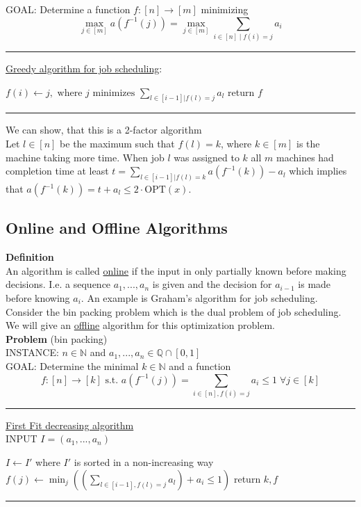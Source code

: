 \documentclass[a4paper, 12pt]{article}
\begin{document}
	\noindent GOAL: Determine a function $f: [n] \to [m]$ minimizing \[\max_{j \in [m]} a(f^{-1}(j)) = \max_{j \in [m]} \sum_{i \in [n] \; | \; f(i) = j} a_i\]
	
	\par\noindent\rule{\textwidth}{0.4pt}
	\noindent\underline{Greedy algorithm for job scheduling}:
	\begin{algorithmic}[1]
			\State $f(i) \gets j, \text{ where $j$ minimizes } \sum_{l \in [i-1] | f(l) = j} a_l$
		\EndFor
		\State return $f$
	\end{algorithmic}
	\par\noindent\rule{\textwidth}{0.4pt}
	We can show, that this is a 2-factor algorithm\\
	Let $l \in [n]$ be the maximum such that $f(l) = k$, where $k \in [m]$ is the machine taking more time. When job $l$ was assigned to $k$ all $m$ machines had completion time at least $t = \sum_{l \in [i-1] | f(l) = k} a(f^{-1}(k))-a_l$ which implies that $a(f^{-1}(k)) = t+a_l \leq 2\cdot\text{OPT}(x)$.
	
	\subsection{Online and Offline Algorithms}
	\textbf{Definition}\\
	An algorithm is called \underline{online} if the input in only partially known before making decisions. I.e. a sequence $a_1,...,a_n$ is given and the decision for $a_{i-1}$ is made before knowing $a_i$. An example is Graham's algorithm for job scheduling.\\
	
	Consider the bin packing problem which is the dual problem of job scheduling. We will give an \underline{offline} algorithm for this optimization problem.\\
	\textbf{Problem} (bin packing)\\
	INSTANCE: $n \in \mathbb{N}$ and $a_1,...,a_n \in \mathbb{Q} \cap [0,1]$\\
	GOAL: Determine the minimal $k \in \mathbb{N}$ and a function \[f: [n] \to [k] \text{ s.t. } a(f^{-1}(j)) = \sum_{i \in [n], f(i) = j} a_i \leq 1 \; \forall j \in [k]\]
	\par\noindent\rule{\textwidth}{0.4pt}
	\underline{First Fit decreasing algorithm}\\
	INPUT $I = (a_1,...,a_n)$
	\begin{algorithmic}[1]
		\State $I \gets I'$ where $I'$ is sorted in a non-increasing way
			\State $f(j) \gets \min_j ((\sum_{l \in [i-1], f(l) = j} a_l) + a_i \leq 1)$
		\EndFor
		\State return $k,f$
	\end{algorithmic}
	\par\noindent\rule{\textwidth}{0.4pt}
	
\end{document}
